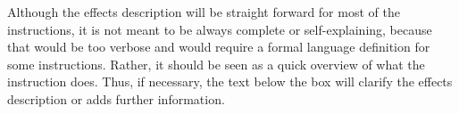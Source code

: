 Although the effects description will be straight forward for most of the instructions, it is not meant to be always complete or self-explaining, because that would be too verbose and would require a formal language definition for some instructions. Rather, it should be seen as a quick overview of what the instruction does. Thus, if necessary, the text below the box will clarify the effects description or adds further information.

